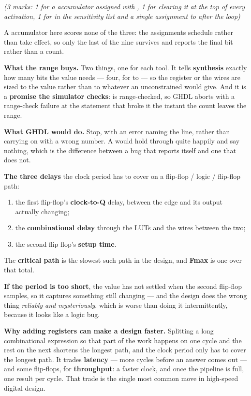 {\itshape (3 marks: 1 for a  accumulator assigned with \code{:=}, 1 for clearing it
at the top of every activation, 1 for  in the sensitivity list and a single assignment
to  after the loop)\par}

\medskip
A  accumulator here scores none of the three: the assignments schedule rather than take
effect, so only the last of the nine survives and  reports the final bit rather than a
count.

\textbf{What the range buys.} Two things, one for each tool. It tells \textbf{synthesis} exactly how
many bits the value needs --- four, for  to  --- so the register or the wires are
sized to the value rather than to whatever an unconstrained  would give. And it is a
\textbf{promise the simulator checks}:  is range-checked, so GHDL aborts
with a range-check failure at the statement that broke it the instant the count leaves the range.

\textbf{What GHDL would do.} Stop, with an error naming the line, rather than carrying on with a
wrong number. A  would hold  through  quite
happily and say nothing, which is the difference between a bug that reports itself and one that
does not. 

\textbf{The three delays} the clock period has to cover on a flip-flop / logic / flip-flop path:
\begin{enumerate}
  \item the first flip-flop's \textbf{clock-to-Q} delay, between the edge and its output actually
    changing;
  \item the \textbf{combinational delay} through the LUTs and the wires between the two;
  \item the second flip-flop's \textbf{setup time}.
\end{enumerate}
The \textbf{critical path} is the slowest such path in the design, and \textbf{Fmax} is one over
that total. 

\textbf{If the period is too short}, the value has not settled when the second flip-flop samples,
so it captures something still changing --- and the design does the wrong thing \emph{reliably and
mysteriously}, which is worse than doing it intermittently, because it looks like a logic bug.

\textbf{Why adding registers can make a design faster.} Splitting a long combinational expression
so that part of the work happens on one cycle and the rest on the next shortens the longest path,
and the clock period only has to cover the longest path. It trades \textbf{latency} --- more cycles
before an answer comes out --- and some flip-flops, for \textbf{throughput}: a faster clock, and
once the pipeline is full, one result per cycle. That trade is the single most common move in
high-speed digital design. 


